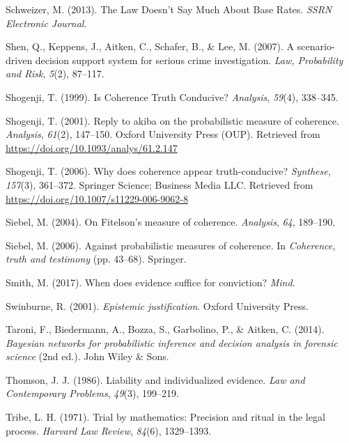 \documentclass[11pt,dvipsnames,enabledeprecatedfontcommands]{scrartcl}
\begin{document}
\hypertarget{ref-schweizer2013LawDoesnSay}{}
Schweizer, M. (2013). The Law Doesn't Say Much About Base Rates.
\emph{SSRN Electronic Journal}.

\hypertarget{ref-shen2007ScenariodrivenDecisionSupporta}{}
Shen, Q., Keppens, J., Aitken, C., Schafer, B., \& Lee, M. (2007). A
scenario-driven decision support system for serious crime investigation.
\emph{Law, Probability and Risk}, \emph{5}(2), 87--117.

\hypertarget{ref-shogenji1999}{}
Shogenji, T. (1999). Is Coherence Truth Conducive? \emph{Analysis},
\emph{59}(4), 338--345.

\hypertarget{ref-Shogenji2001Reply}{}
Shogenji, T. (2001). Reply to akiba on the probabilistic measure of
coherence. \emph{Analysis}, \emph{61}(2), 147--150. Oxford University
Press (OUP). Retrieved from
\url{https://doi.org/10.1093/analys/61.2.147}

\hypertarget{ref-Shogenji2006Why}{}
Shogenji, T. (2006). Why does coherence appear truth-conducive?
\emph{Synthese}, \emph{157}(3), 361--372. Springer Science; Business
Media LLC. Retrieved from
\url{https://doi.org/10.1007/s11229-006-9062-8}

\hypertarget{ref-Siebel2004On-Fitelsons-me}{}
Siebel, M. (2004). On Fitelson's measure of coherence. \emph{Analysis},
\emph{64}, 189--190.

\hypertarget{ref-siebel2006against}{}
Siebel, M. (2006). Against probabilistic measures of coherence. In
\emph{Coherence, truth and testimony} (pp. 43--68). Springer.

\hypertarget{ref-Smith_conviction_mind_2017}{}
Smith, M. (2017). When does evidence suffice for conviction?
\emph{Mind}.

\hypertarget{ref-Swinburne2001-SWIEJ}{}
Swinburne, R. (2001). \emph{Epistemic justification}. Oxford University
Press.

\hypertarget{ref-taroni2006bayesian}{}
Taroni, F., Biedermann, A., Bozza, S., Garbolino, P., \& Aitken, C.
(2014). \emph{Bayesian networks for probabilistic inference and decision
analysis in forensic science} (2nd ed.). John Wiley \& Sons.

\hypertarget{ref-Thomson86}{}
Thomson, J. J. (1986). Liability and individualized evidence. \emph{Law
and Contemporary Problems}, \emph{49}(3), 199--219.

\hypertarget{ref-tribe71}{}
Tribe, L. H. (1971). Trial by mathematics: Precision and ritual in the
legal process. \emph{Harvard Law Review}, \emph{84}(6), 1329--1393.
\end{document}

